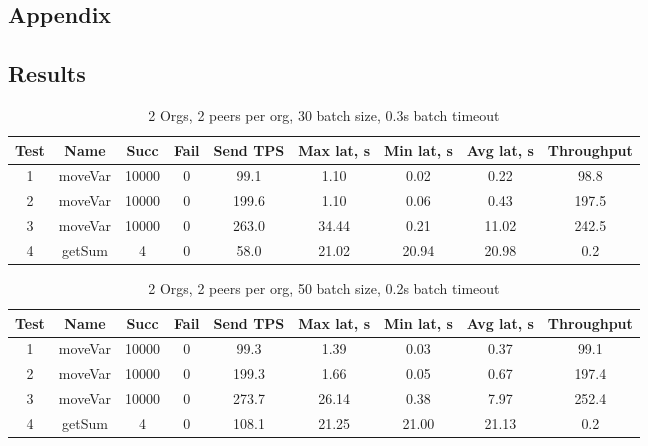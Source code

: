 \begin{appendices}
\chapter{Appendix}

\section{Results} \label{apdx:1}

\begin{table}[h!]
\begin{center}
\begin{tabular}{ |c|c|c|c|c|c|c|c|c| }
 \hline
  Test & Name & Succ  & Fail & Send TPS & Max lat, s & Min lat, s & Avg lat, s & Throughput \\
 \hline
 \hline
 1    & moveVar & 10000 & 0    & 99.1  & 1.10      & 0.02      & 0.22      & 98.8 \\
 \hline
 2    & moveVar & 10000 & 0    & 199.6 & 1.10      & 0.06      & 0.43      & 197.5 \\
 \hline
 3    & moveVar & 10000 & 0    & 263.0 & 34.44     & 0.21      & 11.02     & 242.5 \\
 \hline
 4    & getSum  & 4     & 0    & 58.0  & 21.02     & 20.94     & 20.98     & 0.2 \\
 \hline
\end{tabular}
\end{center}
\caption{2 Orgs, 2 peers per org, 30 batch size, 0.3s batch timeout}
\end{table}

\begin{table}[h!]
\begin{center}
\begin{tabular}{ |c|c|c|c|c|c|c|c|c| }
 \hline
  Test & Name & Succ  & Fail & Send TPS & Max lat, s & Min lat, s & Avg lat, s & Throughput \\
 \hline
 \hline
 1    & moveVar & 10000 & 0    & 99.3  & 1.39      & 0.03      & 0.37      & 99.1   \\
 \hline
 2    & moveVar & 10000 & 0    & 199.3 & 1.66      & 0.05      & 0.67      & 197.4  \\
 \hline
 3    & moveVar & 10000 & 0    & 273.7 & 26.14     & 0.38      & 7.97      & 252.4  \\
 \hline
 4    & getSum  & 4     & 0    & 108.1 & 21.25     & 21.00     & 21.13     & 0.2    \\
 \hline
\end{tabular}
\end{center}
\caption{2 Orgs, 2 peers per org, 50 batch size, 0.2s batch timeout}
\end{table}


\end{appendices}
